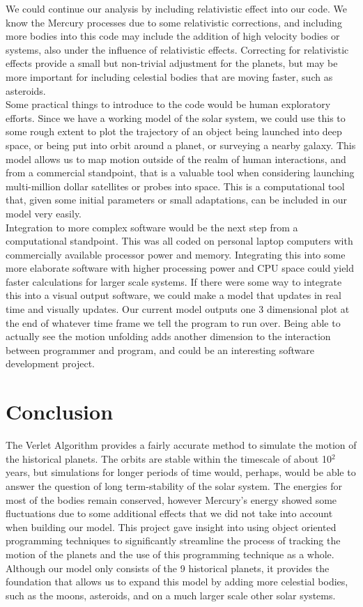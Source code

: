 \documentclass{article}
\begin{document}
We could continue our analysis by including relativistic effect into our code. We know the Mercury processes due to some relativistic corrections, and including more bodies into this code may include the addition of high velocity bodies or systems, also under the influence of relativistic effects. Correcting for relativistic effects provide a small but non-trivial adjustment for the planets, but may be more important for including celestial bodies that are moving faster, such as asteroids.  \\

Some practical things to introduce to the code would be human exploratory efforts. Since we have a working model of the solar system, we could use this to some rough extent to plot the trajectory of an object being launched into deep space, or being put into orbit around a planet, or surveying a nearby galaxy. This model allows us to map motion outside of the realm of human interactions, and from a commercial standpoint, that is a valuable tool when considering launching multi-million dollar satellites or probes into space. This is a computational tool that, given some initial parameters or small adaptations, can be included in our model very easily.\\

Integration to more complex software would be the next step from a computational standpoint. This was all coded on personal laptop computers with commercially available processor power and memory. Integrating this into some more elaborate software with higher processing power and CPU space could  yield faster calculations for larger scale systems. If there were some way to integrate this into a visual output software, we could make a model that updates in real time and visually updates. Our current model outputs one 3 dimensional plot at the end of whatever time frame we tell the program to run over. Being able to actually see the motion unfolding adds another dimension to the interaction between programmer and program, and could be an interesting software development project. \\

\section{Conclusion}
The Verlet Algorithm provides a fairly accurate method to simulate the motion of the historical planets. The orbits are stable within the timescale of about 10$^2$ years, but simulations for longer periods of time would, perhaps, would be able to answer the question of long term-stability of the solar system. The energies for most of the bodies remain conserved, however Mercury's energy showed some fluctuations due to some additional effects that we did not take into account when building our model. This project gave insight into using object oriented programming techniques to significantly streamline the process of tracking the motion of the planets and the use of this programming technique as a whole. Although our model only consists of the 9 historical planets, it provides the foundation that allows us to expand this model by adding more celestial bodies, such as the moons, asteroids, and on a much larger scale other solar systems.
\end{document}

